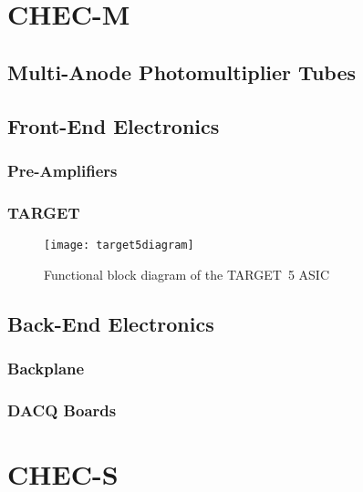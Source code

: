\section{CHEC-M}


\subsection{Multi-Anode Photomultiplier Tubes}


\subsection{Front-End Electronics}

\subsubsection{Pre-Amplifiers}

\subsubsection{TARGET}

\begin{figure}
	\centering\texttt{[image: target5diagram]} 
	\caption[Functional block diagram of the TARGET~5 ASIC.]{Functional block diagram of the TARGET~5 ASIC \cite{Albert2017} }
	\label{fig:target5diagram}
\end{figure}

\subsection{Back-End Electronics}

\subsubsection{Backplane}

\subsubsection{DACQ Boards}

\section{CHEC-S}

